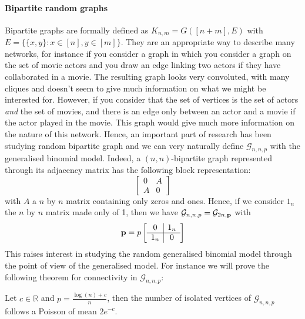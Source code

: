 \paragraph{Bipartite random graphs}
Bipartite graphs are formally defined as $K_{n,m} = G([n+m], E)$ with $E=\{\{x,y\} : x\in[n], y\in[m]\}$.
They are an appropriate way to describe many networks, for instance if you consider a graph in which you consider a graph on the set of movie actors and you draw an edge linking two actors if they have collaborated in a movie.
The resulting graph looks very convoluted, with many cliques and doesn't seem to give much information on what we might be interested for.
However, if you consider that the set of vertices is the set of actors \emph{and} the set of movies, and there is an edge only between an actor and a movie if the actor played in the movie.
This graph would give much more information on the nature of this network.
\newline
Hence, an important part of research has been studying random bipartite graph and we can very naturally define $\mathcal{G}_{n,n, p}$ with the generalised binomial model.
Indeed, a $(n,n)$-bipartite graph represented through its adjacency matrix has the following block representation:
\begin{equation}
    \left[
\begin{array}{c|c}
        0 & A \\
         \hline
        A & 0
        \end{array}
\right]
\end{equation}
with $A$ a $n$ by $n$ matrix containing only zeros and ones.
Hence, if we consider $1_n$ the $n$ by $n$ matrix made only of 1, then we have $\mathcal{G}_{n,n,p} = \mathcal{G}_{2n,\bold{p}}$ with
\begin{equation}\label{eq:pMat}
    \bold{p} = p\left[
\begin{array}{c|c}
        0 & 1_n \\
         \hline
        1_n & 0
        \end{array}
\right]
\end{equation}
This raises interest in studying the random generalised binomial model through the point of view of the generalised model.
For instance we will prove the following theorem for connectivity in $\mathcal{G}_{n,n,p}$:
\begin{theorem}
	Let $c\in \mathbb{R}$ and $p=\frac{\log(n) + c}{n}$, then the number of isolated vertices of $\mathcal{G}_{n,n,p}$  follows a Poisson of mean $2e^{-c}$.
\end{theorem}
